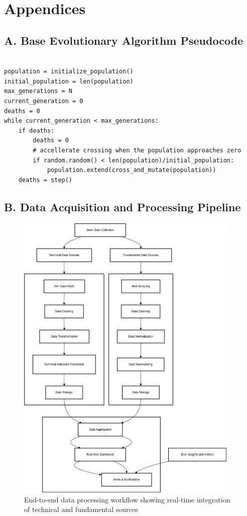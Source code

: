 \documentclass[12pt]{article}
\begin{document}
\section*{Appendices}
\label{sec:appendices}
\subsection*{A. Base Evolutionary Algorithm Pseudocode}
\begin{lstlisting}

population = initialize_population()
initial_population = len(population)
max_generations = N
current_generation = 0
deaths = 0
while current_generation < max_generations:
    if deaths:
        deaths = 0
        # accellerate crossing when the population approaches zero
        if random.random() < len(population)/initial_population:
            population.extend(cross_and_mutate(population))
    deaths = step()

\end{lstlisting}


\subsection*{B. Data Acquisition and Processing Pipeline}
\label{app:data}

\begin{figure}[H]
\centering
\includegraphics[width=0.95\textwidth]{data_pipeline.png}
\caption{End-to-end data processing workflow showing real-time integration of technical and fundamental sources}
\label{fig:data_pipeline}
\end{figure}
\end{document}

